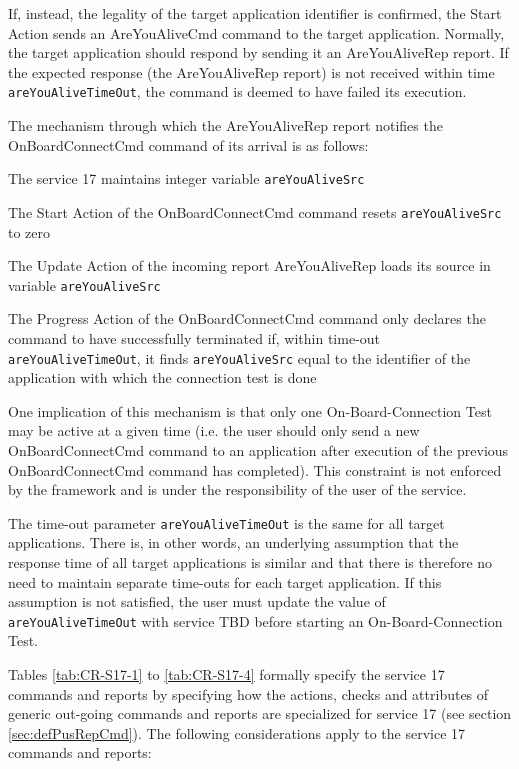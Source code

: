 \documentclass[a4paper,10pt]{article}
\newenvironment{fw_itemize}						%
{\begin{itemize}
  \setlength{\itemsep}{1mm}
  \setlength{\parskip}{0pt}
  \setlength{\parsep}{0pt}}
{\end{itemize}}
\begin{document}
If, instead, the legality of the target application identifier is confirmed, the Start Action sends an AreYouAliveCmd command to the target application. Normally, the target application should respond by sending it an AreYouAliveRep report. If the expected response (the AreYouAliveRep report) is not received within time \texttt{areYouAliveTimeOut}, the command is deemed to have failed its execution.

The mechanism through which the AreYouAliveRep report notifies the OnBoardConnectCmd command of its arrival is as follows:

\begin{fw_itemize}
\item The service 17 maintains integer variable \texttt{areYouAliveSrc}
\item The Start Action of the OnBoardConnectCmd command resets \texttt{areYouAliveSrc} to zero
\item The Update Action of the incoming report AreYouAliveRep loads its source in variable \texttt{areYouAliveSrc}
\item The Progress Action of the OnBoardConnectCmd command only declares the command to have successfully terminated if, within time-out \texttt{areYouAliveTimeOut}, it finds \texttt{areYouAliveSrc} equal to the identifier of the application with which the connection test is done
\end{fw_itemize}

One implication of this mechanism is that only one On-Board-Connection Test may be active at a given time (i.e. the user should only send a new OnBoardConnectCmd command to an application after execution of the previous OnBoardConnectCmd command has completed). This constraint is not enforced by the framework and is under the responsibility of the user of the service.

The time-out parameter \texttt{areYouAliveTimeOut} is the same for all target applications. There is, in other words, an underlying assumption that the response time of all target applications is similar and that there is therefore no need to maintain separate time-outs for each target application. If this assumption is not satisfied, the user must update the value of \texttt{areYouAliveTimeOut} with service TBD before starting an On-Board-Connection Test.

Tables \ref{tab:CR-S17-1} to \ref{tab:CR-S17-4} formally specify the service 17 commands and reports by specifying how the actions, checks and attributes of generic out-going commands and reports are specialized for service 17 (see section \ref{sec:defPusRepCmd}). The following considerations apply to the service 17 commands and reports:
\end{document}
